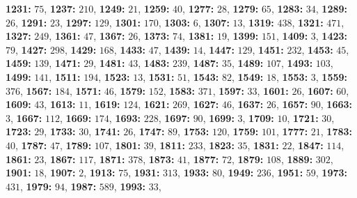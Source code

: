 \textsf{\bfseries 1231:} $75$, \textsf{\bfseries 1237:} $210$, \textsf{\bfseries 1249:} $21$, \textsf{\bfseries 1259:} $40$, \textsf{\bfseries 1277:} $28$, \textsf{\bfseries 1279:} $65$, \textsf{\bfseries 1283:} $34$, \textsf{\bfseries 1289:} $26$, \textsf{\bfseries 1291:} $23$, \textsf{\bfseries 1297:} $129$, \textsf{\bfseries 1301:} $170$, \textsf{\bfseries 1303:} $6$, \textsf{\bfseries 1307:} $13$, \textsf{\bfseries 1319:} $438$, \textsf{\bfseries 1321:} $471$, \textsf{\bfseries 1327:} $249$, \textsf{\bfseries 1361:} $47$, \textsf{\bfseries 1367:} $26$, \textsf{\bfseries 1373:} $74$, \textsf{\bfseries 1381:} $19$, \textsf{\bfseries 1399:} $151$, \textsf{\bfseries 1409:} $3$, \textsf{\bfseries 1423:} $79$, \textsf{\bfseries 1427:} $298$, \textsf{\bfseries 1429:} $168$, \textsf{\bfseries 1433:} $47$, \textsf{\bfseries 1439:} $14$, \textsf{\bfseries 1447:} $129$, \textsf{\bfseries 1451:} $232$, \textsf{\bfseries 1453:} $45$, \textsf{\bfseries 1459:} $139$, \textsf{\bfseries 1471:} $29$, \textsf{\bfseries 1481:} $43$, \textsf{\bfseries 1483:} $239$, \textsf{\bfseries 1487:} $35$, \textsf{\bfseries 1489:} $107$, \textsf{\bfseries 1493:} $103$, \textsf{\bfseries 1499:} $141$, \textsf{\bfseries 1511:} $194$, \textsf{\bfseries 1523:} $13$, \textsf{\bfseries 1531:} $51$, \textsf{\bfseries 1543:} $82$, \textsf{\bfseries 1549:} $18$, \textsf{\bfseries 1553:} $3$, \textsf{\bfseries 1559:} $376$, \textsf{\bfseries 1567:} $184$, \textsf{\bfseries 1571:} $46$, \textsf{\bfseries 1579:} $152$, \textsf{\bfseries 1583:} $371$, \textsf{\bfseries 1597:} $33$, \textsf{\bfseries 1601:} $26$, \textsf{\bfseries 1607:} $60$, \textsf{\bfseries 1609:} $43$, \textsf{\bfseries 1613:} $11$, \textsf{\bfseries 1619:} $124$, \textsf{\bfseries 1621:} $269$, \textsf{\bfseries 1627:} $46$, \textsf{\bfseries 1637:} $26$, \textsf{\bfseries 1657:} $90$, \textsf{\bfseries 1663:} $3$, \textsf{\bfseries 1667:} $112$, \textsf{\bfseries 1669:} $174$, \textsf{\bfseries 1693:} $228$, \textsf{\bfseries 1697:} $90$, \textsf{\bfseries 1699:} $3$, \textsf{\bfseries 1709:} $10$, \textsf{\bfseries 1721:} $30$, \textsf{\bfseries 1723:} $29$, \textsf{\bfseries 1733:} $30$, \textsf{\bfseries 1741:} $26$, \textsf{\bfseries 1747:} $89$, \textsf{\bfseries 1753:} $120$, \textsf{\bfseries 1759:} $101$, \textsf{\bfseries 1777:} $21$, \textsf{\bfseries 1783:} $40$, \textsf{\bfseries 1787:} $47$, \textsf{\bfseries 1789:} $107$, \textsf{\bfseries 1801:} $39$, \textsf{\bfseries 1811:} $233$, \textsf{\bfseries 1823:} $35$, \textsf{\bfseries 1831:} $22$, \textsf{\bfseries 1847:} $114$, \textsf{\bfseries 1861:} $23$, \textsf{\bfseries 1867:} $117$, \textsf{\bfseries 1871:} $378$, \textsf{\bfseries 1873:} $41$, \textsf{\bfseries 1877:} $72$, \textsf{\bfseries 1879:} $108$, \textsf{\bfseries 1889:} $302$, \textsf{\bfseries 1901:} $18$, \textsf{\bfseries 1907:} $2$, \textsf{\bfseries 1913:} $75$, \textsf{\bfseries 1931:} $313$, \textsf{\bfseries 1933:} $80$, \textsf{\bfseries 1949:} $236$, \textsf{\bfseries 1951:} $59$, \textsf{\bfseries 1973:} $431$, \textsf{\bfseries 1979:} $94$, \textsf{\bfseries 1987:} $589$, \textsf{\bfseries 1993:} $33$, 
